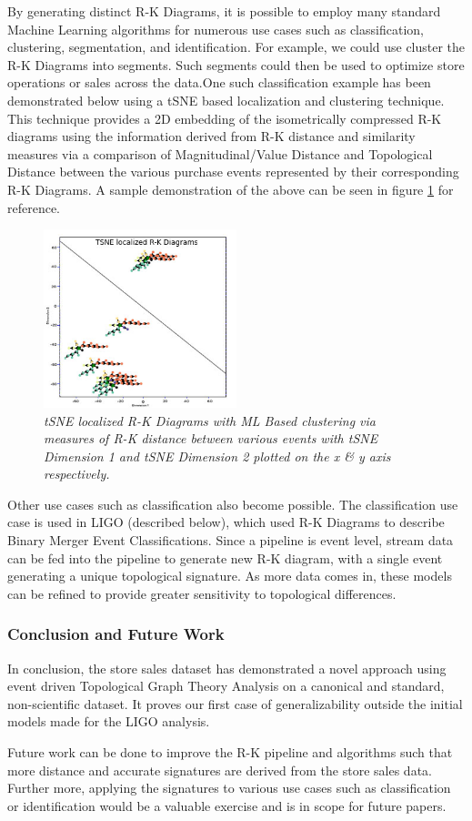 By generating distinct R-K Diagrams, it is possible to employ many standard Machine Learning algorithms for numerous use cases such as classification, clustering, segmentation, and identification. For example, we could use cluster the R-K Diagrams into segments. Such segments could then be used to optimize store operations or sales across the data.One such classification example has been demonstrated below using a tSNE based localization and clustering technique. This technique provides a 2D embedding of the isometrically compressed R-K diagrams using the information derived from R-K distance and similarity measures via a comparison of Magnitudinal/Value Distance and Topological Distance between the various purchase events represented by their corresponding R-K Diagrams. A sample demonstration of the above can be seen in figure \ref{fig:tsne} for reference.

 \begin{figure}[h]
	\centering
       \includegraphics[width=0.5\textwidth]{images/tSNE LocalizedRKDiagrams.jpg}
  \caption{\textit{tSNE localized R-K Diagrams with ML Based clustering via measures of R-K distance between various events with tSNE Dimension 1 and tSNE Dimension 2 plotted on the x \& y axis respectively.}}
 \label{fig:tsne}
\end{figure}

Other use cases such as classification also become possible. The classification use case is used in LIGO (described below), which used R-K Diagrams to describe Binary Merger Event Classifications. Since a pipeline is event level, stream data can be fed into the pipeline to generate new R-K diagram, with a single event generating a unique topological signature. As more data comes in, these models can be refined to provide greater sensitivity to topological differences.


\subsubsection{Conclusion and Future Work}

In conclusion, the store sales dataset has demonstrated a novel approach using event driven Topological Graph Theory Analysis on a canonical and standard, non-scientific dataset. It proves our first case of generalizability outside the initial models made for the LIGO analysis.

Future work can be done to improve the R-K pipeline and algorithms such that more distance and accurate signatures are derived from the store sales data. Further more, applying the signatures to various use cases such as classification or identification would be a valuable exercise and is in scope for future papers.
